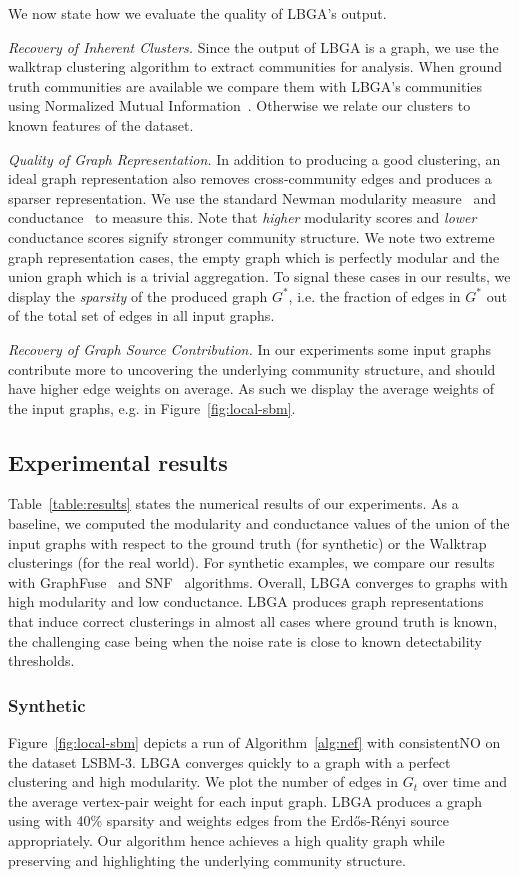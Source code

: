\documentclass{article}
\newcommand{\er}{Erd\H{o}s-R\'{e}nyi }
\begin{document}
We now state how we evaluate the quality of LBGA's output.

{\em Recovery of Inherent Clusters.} Since the output of LBGA is a graph, we
use the walktrap clustering algorithm to extract communities for analysis. When
ground truth communities are available we compare them with LBGA's communities
using Normalized Mutual Information~\cite{Danon05}. Otherwise we relate our
clusters to known features of the dataset. 

{\em Quality of Graph Representation.} In addition to producing a good
clustering, an ideal graph representation also removes cross-community edges
and produces a sparser representation. We use the standard Newman modularity
measure~\cite{Newman06} and conductance~\cite{Leskovec2008} to
measure this. Note that \emph{higher} modularity scores and \emph{lower}
conductance scores signify stronger community structure. We note two extreme
graph representation cases, the empty graph which is perfectly modular and the
union graph which is a trivial aggregation. To signal these cases in our
results, we display the \emph{sparsity} of the produced graph $G^*$, i.e. the
fraction of edges in $G^*$ out of the total set of edges in all input graphs. 

{\em Recovery of Graph Source Contribution.} In our experiments some input
graphs contribute more to uncovering the underlying community structure, and
should have higher edge weights on average. As such we display the average
weights of the input graphs, e.g. in Figure~\ref{fig:local-sbm}. 

\subsection{Experimental results}
\label{sec:results}

Table~\ref{table:results} states the numerical results of our experiments. As a
baseline, we computed the modularity and conductance values of the union of the
input graphs with respect to the ground truth (for synthetic) or the Walktrap
clusterings (for the real world). For synthetic examples, we compare our
results with GraphFuse~\cite{Papalexakis2013} and SNF~\cite{Wang14} algorithms.
Overall, LBGA converges to graphs with high modularity and low conductance.
LBGA produces graph representations that induce correct clusterings in almost
all cases where ground truth is known, the challenging case being when the
noise rate is close to known detectability thresholds. 

\subsubsection{Synthetic}
Figure~\ref{fig:local-sbm} depicts a run of Algorithm~\ref{alg:nef} with
consistentNO on the dataset LSBM-3. LBGA converges quickly to a graph with a
perfect clustering and high modularity. We plot the number of edges in $G_t$
over time and the average vertex-pair weight for each input graph. LBGA
produces a graph using with 40\% sparsity and weights edges from the \er source
appropriately. Our algorithm hence achieves a high quality graph while
preserving and highlighting the underlying community structure. 
\end{document}
